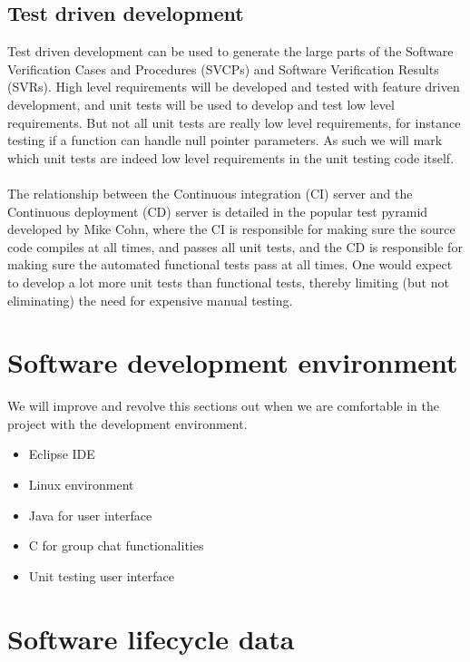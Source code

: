 \documentclass[a4paper]{article}
\begin{document}
\subsection{Test driven development}
Test driven development can be used to generate the large parts of the Software Verification Cases and Procedures (SVCPs) and Software Verification Results (SVRs). High level requirements will be developed and tested with feature driven development, and unit tests will be used to develop and test low level requirements. But not all unit tests are really low level requirements, for instance testing if a function can handle null pointer parameters. As such we will mark which unit tests are indeed low level requirements in the unit testing code itself.\\ 
\\
The relationship between the Continuous integration (CI) server and the Continuous deployment (CD) server is detailed in the popular test pyramid developed by Mike Cohn, where the CI is responsible for making sure the source code compiles at all times, and passes all unit tests, and the CD is responsible for making sure the automated functional tests pass at all times. One would expect to develop a lot more unit tests than functional tests, thereby limiting (but not eliminating) the need for expensive manual testing.\\
\newpage


\section{Software development environment}

We will improve and revolve this sections out when we are comfortable in the project with the development environment.

\begin{itemize}
	\item Eclipse IDE
	\item Linux environment
	\item Java for user interface
	\item C for group chat functionalities
	\item Unit testing user interface
\end{itemize}
\newpage


\section{Software lifecycle data}
\end{document}
